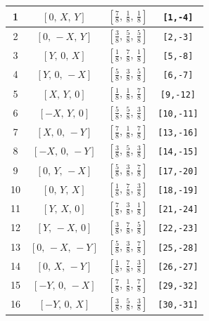 \documentclass[fleqn,8pt]{jsarticle}
\begin{document}
\begin{longtable}{cccc}
1 & $\left[ 0,\, X,\, Y \right]$ & $\left[ \frac{7}{8},\, \frac{1}{8},\, \frac{1}{8} \right]$ & {\tt [1,-4]} \\ \hline
2 & $\left[ 0,\, - X,\, Y \right]$ & $\left[ \frac{3}{8},\, \frac{5}{8},\, \frac{5}{8} \right]$ & {\tt [2,-3]} \\ \hline
3 & $\left[ Y,\, 0,\, X \right]$ & $\left[ \frac{1}{8},\, \frac{7}{8},\, \frac{1}{8} \right]$ & {\tt [5,-8]} \\ \hline
4 & $\left[ Y,\, 0,\, - X \right]$ & $\left[ \frac{5}{8},\, \frac{3}{8},\, \frac{5}{8} \right]$ & {\tt [6,-7]} \\ \hline
5 & $\left[ X,\, Y,\, 0 \right]$ & $\left[ \frac{1}{8},\, \frac{1}{8},\, \frac{7}{8} \right]$ & {\tt [9,-12]} \\ \hline
6 & $\left[ - X,\, Y,\, 0 \right]$ & $\left[ \frac{5}{8},\, \frac{5}{8},\, \frac{3}{8} \right]$ & {\tt [10,-11]} \\ \hline
7 & $\left[ X,\, 0,\, - Y \right]$ & $\left[ \frac{7}{8},\, \frac{1}{8},\, \frac{7}{8} \right]$ & {\tt [13,-16]} \\ \hline
8 & $\left[ - X,\, 0,\, - Y \right]$ & $\left[ \frac{3}{8},\, \frac{5}{8},\, \frac{3}{8} \right]$ & {\tt [14,-15]} \\ \hline
9 & $\left[ 0,\, Y,\, - X \right]$ & $\left[ \frac{5}{8},\, \frac{3}{8},\, \frac{7}{8} \right]$ & {\tt [17,-20]} \\ \hline
10 & $\left[ 0,\, Y,\, X \right]$ & $\left[ \frac{1}{8},\, \frac{7}{8},\, \frac{3}{8} \right]$ & {\tt [18,-19]} \\ \hline
11 & $\left[ Y,\, X,\, 0 \right]$ & $\left[ \frac{7}{8},\, \frac{3}{8},\, \frac{1}{8} \right]$ & {\tt [21,-24]} \\ \hline
12 & $\left[ Y,\, - X,\, 0 \right]$ & $\left[ \frac{3}{8},\, \frac{7}{8},\, \frac{5}{8} \right]$ & {\tt [22,-23]} \\ \hline
13 & $\left[ 0,\, - X,\, - Y \right]$ & $\left[ \frac{5}{8},\, \frac{3}{8},\, \frac{7}{8} \right]$ & {\tt [25,-28]} \\ \hline
14 & $\left[ 0,\, X,\, - Y \right]$ & $\left[ \frac{1}{8},\, \frac{7}{8},\, \frac{3}{8} \right]$ & {\tt [26,-27]} \\ \hline
15 & $\left[ - Y,\, 0,\, - X \right]$ & $\left[ \frac{7}{8},\, \frac{1}{8},\, \frac{7}{8} \right]$ & {\tt [29,-32]} \\ \hline
16 & $\left[ - Y,\, 0,\, X \right]$ & $\left[ \frac{3}{8},\, \frac{5}{8},\, \frac{3}{8} \right]$ & {\tt [30,-31]} \\ \hline

\end{longtable}
\end{document}

